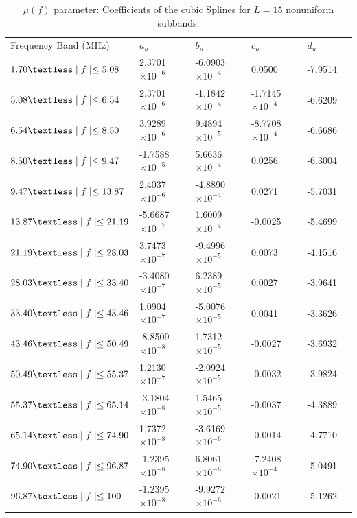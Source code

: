 \documentclass[journal]{IEEEtran}
\begin{document}
\begin{table}[h]
	\setlength\extrarowheight{4.5pt}
	\centering
	\caption{$\mu(f)$ parameter: Coefficients of the cubic Splines for  $L=15$  nonuniform subbands.}
	\label{table_alfasW}
	\begin{tabular}{|C{4cm}|C{3cm}|C{3cm}|C{3cm}|C{3cm}|m{0cm}}
		Frequency Band (MHz)           		   & $a_u$    			  	  & $b_u$	      			  & $c_u$  	 		 		 & $d_u$&\\ 
		$1.70\textless \mid f\mid \leq 5.08$   & 2.3701  $\times 10^{-6}$ & -6.0903 $\times 10^{-4}$  & 0.0500 					 & -7.9514 &\\ 
		$5.08\textless \mid f\mid \leq 6.54$   & 2.3701  $\times 10^{-6}$ & -1.1842 $\times 10^{-4}$  & -1.7145 $\times 10^{-4}$ & -6.6209 &\\ 
		$6.54\textless \mid f\mid \leq 8.50$   & 3.9289  $\times 10^{-6}$ & 9.4894  $\times 10^{-5}$  & -8.7708 $\times 10^{-4}$ & -6.6686 &\\ 
		$8.50\textless \mid f\mid \leq 9.47$   & -1.7588 $\times 10^{-5}$ & 5.6636  $\times 10^{-4}$  & 0.0256                   & -6.3004 &\\ 
		$9.47\textless \mid f\mid \leq 13.87$  & 2.4037  $\times 10^{-6}$ & -4.8890 $\times 10^{-4}$  & 0.0271					 & -5.7031 &\\ 
		$13.87\textless \mid f\mid \leq 21.19$ & -5.6687 $\times 10^{-7}$ & 1.6009  $\times 10^{-4}$  & -0.0025		    		 & -5.4699 &\\ 
		$21.19\textless \mid f\mid \leq 28.03$ & 3.7473  $\times 10^{-7}$ & -9.4996 $\times 10^{-5}$  & 0.0073  				 & -4.1516 &\\ 
		$28.03\textless \mid f\mid \leq 33.40$ & -3.4080 $\times 10^{-7}$ & 6.2389  $\times 10^{-5}$  & 0.0027 					 & -3.9641 &\\ 
		$33.40\textless \mid f\mid \leq 43.46$ & 1.0904  $\times 10^{-7}$ & -5.0076 $\times 10^{-5}$  & 0.0041  				 & -3.3626 &\\ 
		$43.46\textless \mid f\mid \leq 50.49$ & -8.8509 $\times 10^{-8}$ & 1.7312  $\times 10^{-5}$  & -0.0027					 & -3.6932 &\\ 
		$50.49\textless \mid f\mid \leq 55.37$ & 1.2130  $\times 10^{-7}$ & -2.0924 $\times 10^{-5}$  & -0.0032  				 & -3.9824 &\\ 
		$55.37\textless \mid f\mid \leq 65.14$ & -3.1804 $\times 10^{-8}$ & 1.5465  $\times 10^{-5}$  & -0.0037 				 & -4.3889 &\\ 
		$65.14\textless \mid f\mid \leq 74.90$ & 1.7372  $\times 10^{-8}$ & -3.6169 $\times 10^{-6}$  & -0.0014  			     & -4.7710 &\\ 
		$74.90\textless \mid f\mid \leq 96.87$ & -1.2395 $\times 10^{-8}$ & 6.8061  $\times 10^{-6}$  & -7.2408 $\times 10^{-4}$ & -5.0491 &\\ 
		$96.87\textless \mid f\mid \leq 100$   & -1.2395 $\times 10^{-8}$ & -9.9272 $\times 10^{-6}$  & -0.0021 				 & -5.1262 &\\ 
	\end{tabular}
\end{table}
\end{document}
